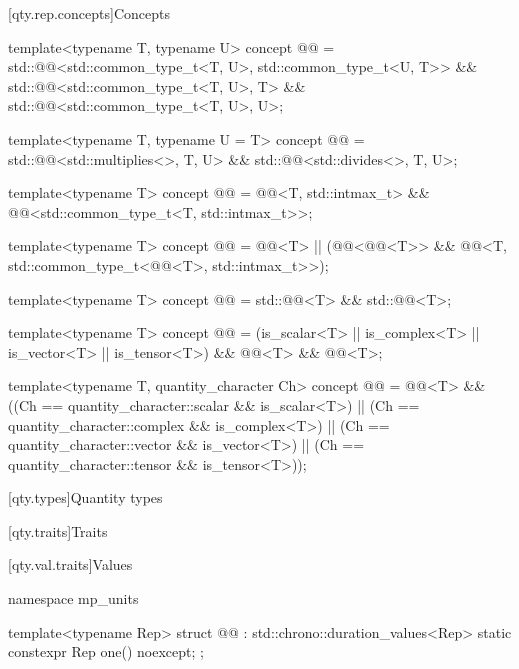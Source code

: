 [qty.rep.concepts]{Concepts}

\begin{itemdecl}
template<typename T, typename U>
concept @@ = std::@@<std::common_type_t<T, U>, std::common_type_t<U, T>> &&
                         std::@@<std::common_type_t<T, U>, T> &&
                         std::@@<std::common_type_t<T, U>, U>;

template<typename T, typename U = T>
concept @@ = std::@@<std::multiplies<>, T, U> &&
                         std::@@<std::divides<>, T, U>;

template<typename T>
concept @@ =
  @@<T, std::intmax_t> && @@<std::common_type_t<T, std::intmax_t>>;

template<typename T>
concept @@ =
  @@<T> ||
  (@@<@@<T>> &&
   @@<T, std::common_type_t<@@<T>, std::intmax_t>>);

template<typename T>
concept @@ = std::@@<T> && std::@@<T>;

template<typename T>
concept @@ = (is_scalar<T> || is_complex<T> || is_vector<T> || is_tensor<T>) &&
                         @@<T> && @@<T>;

template<typename T, quantity_character Ch>
concept @@ =
  @@<T> && ((Ch == quantity_character::scalar && is_scalar<T>) ||
                        (Ch == quantity_character::complex && is_complex<T>) ||
                        (Ch == quantity_character::vector && is_vector<T>) ||
                        (Ch == quantity_character::tensor && is_tensor<T>));
\end{itemdecl}

[qty.types]{Quantity types}

[qty.traits]{Traits}

[qty.val.traits]{Values}

\begin{codeblock}
namespace mp_units {

template<typename Rep>
struct @@ : std::chrono::duration_values<Rep> {
  static constexpr Rep one() noexcept;
};

}
\end{codeblock}

